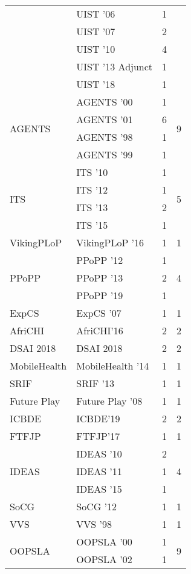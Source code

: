 \begin{table*}[t]
\begin{tabular}{llrr}
& UIST '06 & 1 &\\
& UIST '07 & 2 &\\
& UIST '10 & 4 &\\
& UIST '13 Adjunct & 1 &\\
& UIST '18 & 1 &\\
\multirow{4}{*}{AGENTS } & AGENTS '00 & 1 & \multirow{4}{*}{9}\\
& AGENTS '01 & 6 &\\
& AGENTS '98 & 1 &\\
& AGENTS '99 & 1 &\\
\multirow{4}{*}{ITS } & ITS '10 & 1 & \multirow{4}{*}{5}\\
& ITS '12 & 1 &\\
& ITS '13 & 2 &\\
& ITS '15 & 1 &\\
\multirow{1}{*}{VikingPLoP } & VikingPLoP '16 & 1 & \multirow{1}{*}{1}\\
\multirow{3}{*}{PPoPP } & PPoPP '12 & 1 & \multirow{3}{*}{4}\\
& PPoPP '13 & 2 &\\
& PPoPP '19 & 1 &\\
\multirow{1}{*}{ExpCS } & ExpCS '07 & 1 & \multirow{1}{*}{1}\\
\multirow{1}{*}{AfriCHI} & AfriCHI'16 & 2 & \multirow{1}{*}{2}\\
\multirow{1}{*}{DSAI 2018} & DSAI 2018 & 2 & \multirow{1}{*}{2}\\
\multirow{1}{*}{MobileHealth } & MobileHealth '14 & 1 & \multirow{1}{*}{1}\\
\multirow{1}{*}{SRIF } & SRIF '13 & 1 & \multirow{1}{*}{1}\\
\multirow{1}{*}{Future Play } & Future Play '08 & 1 & \multirow{1}{*}{1}\\
\multirow{1}{*}{ICBDE} & ICBDE'19 & 2 & \multirow{1}{*}{2}\\
\multirow{1}{*}{FTFJP} & FTFJP'17 & 1 & \multirow{1}{*}{1}\\
\multirow{3}{*}{IDEAS } & IDEAS '10 & 2 & \multirow{3}{*}{4}\\
& IDEAS '11 & 1 &\\
& IDEAS '15 & 1 &\\
\multirow{1}{*}{SoCG } & SoCG '12 & 1 & \multirow{1}{*}{1}\\
\multirow{1}{*}{VVS } & VVS '98 & 1 & \multirow{1}{*}{1}\\
\multirow{8}{*}{OOPSLA } & OOPSLA '00 & 1 & \multirow{8}{*}{9}\\
& OOPSLA '02 & 1 &\\

\end{tabular}
\end{table*}
